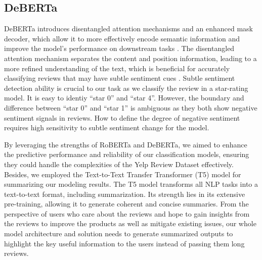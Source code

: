 \documentclass[11pt]{article}
\begin{document}
\subsection{DeBERTa}
DeBERTa introduces disentangled attention mechanisms and an enhanced mask decoder, which allow it to more effectively encode semantic information and improve the model's performance on downstream tasks \citep{he2020deberta}. The disentangled attention mechanism separates the content and position information, leading to a more refined understanding of the text, which is beneficial for accurately classifying reviews that may have subtle sentiment cues \citep{he2020deberta}. Subtle sentiment detection ability is crucial to our task as we classify the review in a star-rating model. It is easy to identiy “star 0” and “star 4”. However, the boundary and difference between “star 0” and “star 1” is ambiguous as they both show negative sentiment signals in reviews. How to define the degree of negative sentiment requires high sensitivity to subtle sentiment change for the model.

By leveraging the strengths of RoBERTa and DeBERTa, we aimed to enhance the predictive performance and reliability of our classification models, ensuring they could handle the complexities of the Yelp Review Dataset effectively. Besides, we employed the Text-to-Text Transfer Transformer (T5) model for summarizing our modeling results. The T5 model transforms all NLP tasks into a text-to-text format, including summarization. Its strength lies in its extensive pre-training, allowing it to generate coherent and concise summaries. From the perspective of users who care about the reviews and hope to gain insights from the reviews to improve the products as well as mitigate existing issues, our whole model architecture and solution needs to generate summarized outputs to highlight the key useful information to the users instead of passing them long reviews.
\end{document}
